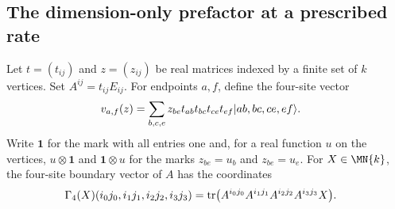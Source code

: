 \subsection{The dimension-only prefactor at a prescribed rate}

\begin{definition}
    \label{def:weighted-matrix-unit-path-vectors}
    \leanok
    Let $t=(t_{ij})$ and $z=(z_{ij})$ be real matrices indexed by a finite
    set of $k$ vertices. Set $A^{ij}=t_{ij}E_{ij}$. For endpoints $a,f$,
    define the four-site vector
    \begin{align}
        v_{a,f}(z)
         & =\sum_{b,c,e}z_{be}t_{ab}t_{bc}t_{ce}t_{ef}
        |ab,bc,ce,ef\rangle. \notag
    \end{align}
    Write $\mathbf 1$ for the mark with all entries one and, for a real
    function $u$ on the vertices, $u\otimes\mathbf 1$ and $\mathbf 1\otimes u$
    for the marks $z_{be}=u_b$ and $z_{be}=u_e$. For $X\in\MN{k}$, the
    four-site boundary vector of $A$ has the coordinates
    \begin{align}
        \Gamma_4(X)(i_0j_0,i_1j_1,i_2j_2,i_3j_3)
         & =\operatorname{tr}\bigl(A^{i_0j_0}A^{i_1j_1}A^{i_2j_2}A^{i_3j_3}X\bigr).
        \notag
    \end{align}
\end{definition}

